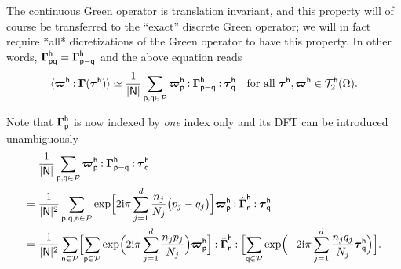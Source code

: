 The continuous Green operator is translation invariant, and this property will
of course be transferred to the “exact” discrete Green operator; we will in fact
require *all* dicretizations of the Green operator to have this property. In
other words,
\(\boldsymbol\Gamma_{\mathsf{p}\mathsf{q}}^{\mathsf{h}}=\boldsymbol\Gamma_{\mathsf p-\mathsf
  q}^{\mathsf{h}}\) and the above equation reads
\begin{equation}
  \langle\boldsymbol\varpi^{\mathsf{h}}\mathbin{\mathord{:}}\boldsymbol\Gamma(\boldsymbol\tau^{\mathsf{h}})\rangle
  \simeq\frac1{\lvert\mathsf{N}\rvert}\sum_{\mathsf{p}, \mathsf{q}\in\mathcal{P}}
  \boldsymbol\varpi_{\mathsf{p}}^{\mathsf{h}}\mathbin{\mathord{:}}
  \boldsymbol\Gamma_{\mathsf p-\mathsf q}^{\mathsf{h}}\mathbin{\mathord{:}}\boldsymbol
  \tau_{\mathsf{q}}^{\mathsf{h}}\quad\text{for all }\boldsymbol\tau^{\mathsf{h}},\boldsymbol
  \varpi^{\mathsf{h}}\in\mathcal T_2^{\mathsf{h}}(\Omega).
\end{equation}

Note that \(\boldsymbol\Gamma_{\mathsf{p}}^{\mathsf{h}}\) is now indexed by \emph{one}
index only and its DFT can be introduced unambiguously
\begin{equation}
  \begin{aligned}[b]
    &\frac{1}{\lvert\mathsf N\rvert}\sum_{\mathsf{p}, \mathsf{q}\in\mathcal{P}}
    \boldsymbol\varpi_{\mathsf{p}}^{\mathsf{h}}\mathbin{\mathord{:}}\boldsymbol\Gamma_{\mathsf p-\mathsf q}^{\mathsf h}
    \mathbin{\mathord{:}}\boldsymbol\tau_{\mathsf{q}}^{\mathsf{h}}\\
    ={}&\frac1{\lvert\mathsf N\rvert^2}\sum_{\mathsf p, \mathsf q, \mathsf n\in\mathcal{P}}
    \exp\Bigl[2\mathrm i\pi\sum_{j=1}^d\frac{n_j}{N_j}\bigl(p_j-q_j\bigr)\Bigr]
    \boldsymbol\varpi_{\mathsf{p}}^{\mathsf{h}}\mathbin{\mathord{:}}\hat{\boldsymbol\Gamma}_{\mathsf n}^{\mathsf h}
    \mathbin{\mathord{:}}\boldsymbol\tau_{\mathsf q}^{\mathsf h}\\
    ={}&\frac{1}{\lvert\mathsf N\rvert^2}
    \sum_{\mathsf n\in\mathcal{P}}\Bigl[\sum_{\mathsf{p}\in\mathcal{P}}
    \exp\Bigl(2\mathrm i\pi\sum_{j=1}^d\frac{n_jp_j}{N_j}\Bigr)
    \boldsymbol\varpi_{\mathsf p}^{\mathsf h}\Bigr]\mathbin{\mathord{:}}\hat{\boldsymbol\Gamma}_{\mathsf n}^{\mathsf h}
    \mathbin{\mathord{:}}\Bigl[\sum_{\mathsf q\in\mathcal{P}}\exp\Bigl(-2\mathrm i\pi\sum_{j=1}^d
    \frac{n_jq_j}{N_j}\boldsymbol\tau_{\mathsf q}^{\mathsf{h}}\Bigr)\Bigr].
  \end{aligned}
\end{equation}

